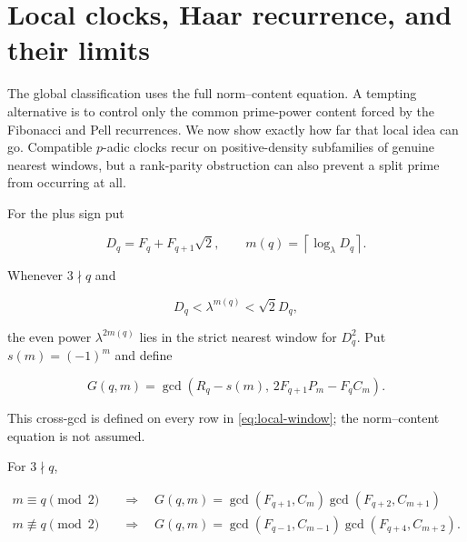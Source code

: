 %
%
\section{Local clocks, Haar recurrence, and their limits}
\label{sec:local-clocks}

The global classification uses the full norm--content equation. A tempting
alternative is to control only the common prime-power content forced by the
Fibonacci and Pell recurrences. We now show exactly how far that local idea
can go. Compatible $p$-adic clocks recur on positive-density subfamilies of
genuine nearest windows, but a rank-parity obstruction can also prevent a
split prime from occurring at all.

For the plus sign put

\begin{equation}
 D_q=F_q+F_{q+1}\sqrt2,
 \qquad
 m(q)=\left\lceil\log_\lambda D_q\right\rceil.
 \label{eq:local-m}
\end{equation}

Whenever $3\nmid q$ and

\begin{equation}
 D_q<\lambda^{m(q)}<\sqrt2D_q,
 \label{eq:local-window}
\end{equation}

the even power $\lambda^{2m(q)}$ lies in the strict nearest window for
$D_q^2$. Put $s(m)=(-1)^{m}$ and define

\begin{equation}
 G(q,m)=\gcd\left(
 R_q-s(m),\,
 2F_{q+1}P_m-F_qC_m
 \right).
 \label{eq:cross-gcd}
\end{equation}

This cross-gcd is defined on every row in \cref{eq:local-window}; the
norm--content equation is not assumed.

\begin{lemma}
\label{lem:cross-gcd-factorisations}
For $3\nmid q$,

\begin{equation}
\begin{aligned}
 m\equiv q\pmod2\quad&\Longrightarrow\quad
 G(q,m)=
 \gcd(F_{q+1},C_m)\gcd(F_{q+2},C_{m+1})\\[2mm]
 m\not\equiv q\pmod2\quad&\Longrightarrow\quad
 G(q,m)=
 \gcd(F_{q-1},C_{m-1})\gcd(F_{q+4},C_{m+2}).
\end{aligned}
\label{eq:cross-gcd-factorisations}
\end{equation}
\end{lemma}

